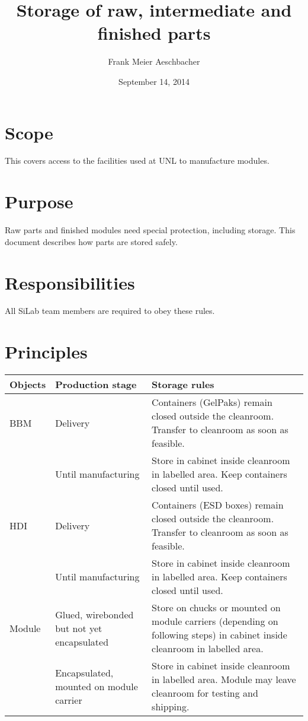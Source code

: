 \documentclass[12pt]{unlsilabsop}
\title{Storage of raw, intermediate and finished parts}
\date{September 14, 2014}
\author{Frank Meier Aeschbacher}
\begin{document}
\maketitle

\section{Scope}
This covers access to the facilities used at UNL to manufacture modules.

\section{Purpose}
Raw parts and finished modules need special protection, including storage. This document describes how parts are stored safely.


\section{Responsibilities}
All SiLab team members are required to obey these rules.

\section{Principles}

\begin{tabular}{p{2.5cm}p{4.5cm}p{8cm}}
    \toprule
Objects & Production stage & Storage rules \\
    \midrule
BBM & Delivery & Containers (GelPaks) remain closed outside the cleanroom. Transfer to cleanroom as soon as feasible. \\
    & Until manufacturing & Store in cabinet inside cleanroom in labelled area. Keep containers closed until used. \\
    \midrule
HDI & Delivery & Containers (ESD boxes) remain closed outside the cleanroom. Transfer to cleanroom as soon as feasible. \\
    & Until manufacturing & Store in cabinet inside cleanroom in labelled area. Keep containers closed until used. \\
    \midrule
Module & Glued, wirebonded but not yet encapsulated & Store on chucks or mounted on module carriers (depending on following steps) in cabinet inside cleanroom in labelled area. \\
       & Encapsulated, mounted on module carrier & Store in cabinet inside cleanroom in labelled area. Module may leave cleanroom for testing and shipping. \\
    \bottomrule
\end{tabular}
\end{document}
